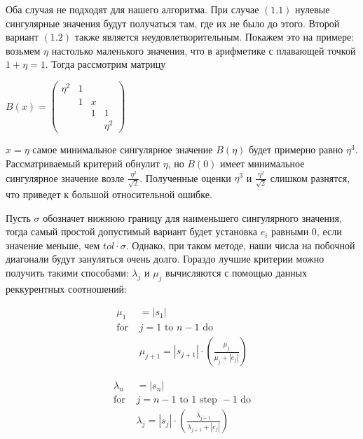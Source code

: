 \documentclass[12pt, a4paper]{report}
\theoremstyle{note}
\begin{document}
Оба случая не подходят для нашего алгоритма. При случае $(1.1)$ нулевые сингулярные значения будут получаться там, где их не было до этого. Второй вариант $(1.2)$ также является неудовлетворительным. Покажем это на примере: возьмем $\eta$ настолько маленького значения, что в арифметике с плавающей точкой $1+\eta=1$. Тогда рассмотрим матрицу
\begin{center}
$B(x)=\begin{pmatrix}
    \eta^2&1&&\\
    &1&x\\
    &&1&1\\
    &&&\eta^2
\end{pmatrix}$
\end{center}

 $x=\eta$ самое минимальное сингулярное значение $B(\eta)$ будет примерно равно $\eta^3$. Рассматриваемый критерий обнулит $\eta$, но $B(0)$ имеет минимальное сингулярное значение возле $\frac{\eta^2}{\sqrt{2}}$. Полученные оценки $\eta^3$ и $\frac{\eta^2}{\sqrt{2}}$ слишком разнятся, что приведет к большой относительной ошибке.

Пусть $\sigma$ обозначет нижнюю границу для наименьшего сингулярного значения, тогда самый простой допустимый вариант будет установка $e_i$ равными 0, если значение меньше, чем $tol\cdot\sigma$. Однако, при таком методе, наши числа на побочной диагонали будут зануляться очень долго. Гораздо лучшие критерии можно получить такими способами:
 $\lambda_j$ и $\mu_j$ вычисляются с помощью данных реккурентных соотношений:

\begin{minipage}{0.48\textwidth}
\begin{align*}
\mu_1& = |s_1| \\
\text{for }& j = 1 \text{ to } n-1 \text{ do} \\
&\mu_{j+1} = |s_{j+1}| \cdot \left( \frac{\mu_j}{\mu_j + |e_j|} \right)
\end{align*}
\end{minipage}
\hfill
\begin{minipage}{0.48\textwidth}
\begin{align*}
\lambda_n& = |s_n| \\
\text{for }& j = n-1 \text{ to } 1 \text{ step } -1 \text{ do} \\
&\lambda_j = |s_j| \cdot \left( \frac{\lambda_{j+1}}{\lambda_{j+1} + |e_j|} \right)
\end{align*}
\end{minipage}
\vspace{1em}
\end{document}
